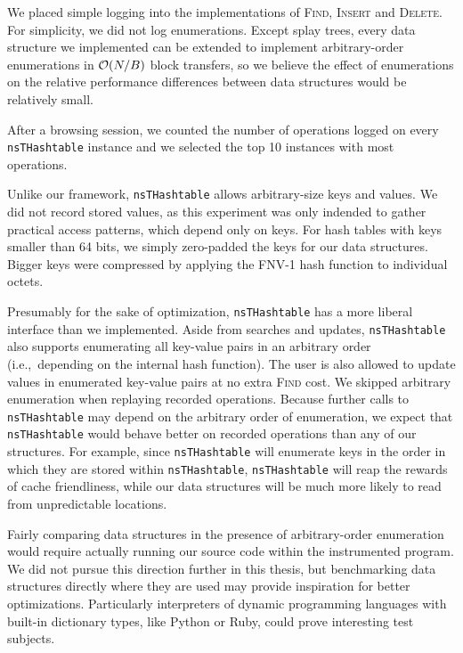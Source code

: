We placed simple logging into the implementations of \textsc{Find},
\textsc{Insert} and \textsc{Delete}. For simplicity, we did not log
enumerations. Except splay trees, every data structure we implemented
can be extended to implement arbitrary-order enumerations in $\mathcal{O}(N/B)$ block
transfers, so we believe the effect of enumerations on the relative performance
differences between data structures would be relatively small.

After a browsing session, we counted the number of operations logged
on every \texttt{nsTHashtable} instance and we selected the top 10
instances with most operations.

Unlike our framework, \texttt{nsTHashtable} allows arbitrary-size keys and
values. We did not record stored values, as this experiment was only indended to
gather practical access patterns, which depend only on keys.
For hash tables with keys smaller than 64 bits, we simply zero-padded the keys
for our data structures. Bigger keys were compressed by applying the FNV-1
hash function to individual octets.

Presumably for the sake of optimization, \texttt{nsTHashtable} has a more
liberal interface than we implemented. Aside from searches and updates,
\texttt{nsTHashtable} also supports enumerating all key-value pairs in
an arbitrary order (i.e.,\ depending on the internal hash function).
The user is also allowed to update values in enumerated key-value pairs
at no extra \textsc{Find} cost.
We skipped arbitrary enumeration when replaying recorded operations.
Because further calls to \texttt{nsTHashtable} may depend on the arbitrary
order of enumeration, we expect that \texttt{nsTHashtable} would behave
better on recorded operations than any of our structures. For example,
since \texttt{nsTHashtable} will enumerate keys in the order in which they
are stored within \texttt{nsTHashtable}, \texttt{nsTHashtable} will reap
the rewards of cache friendliness, while our data structures will be much
more likely to read from unpredictable locations.

Fairly comparing data structures in the presence of arbitrary-order enumeration
would require actually running our source code within the instrumented program.
We did not pursue this direction further in this thesis, but benchmarking data
structures directly where they are used may provide inspiration for better
optimizations. Particularly interpreters of dynamic programming languages
with built-in dictionary types, like Python or Ruby, could prove interesting
test subjects.

